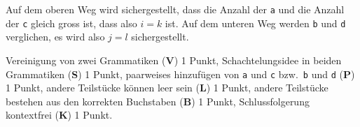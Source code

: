 \begin{loesung}
\begin{center}
\end{center}
Auf dem oberen Weg wird sichergestellt, dass die Anzahl der \texttt{a} und
die Anzahl der \texttt{c} gleich gross ist, dass also $i=k$ ist.
Auf dem unteren Weg werden \texttt{b} und \texttt{d} verglichen, es wird
also $j=l$ sichergestellt.
\end{loesung}

\begin{bewertung}
Vereinigung von zwei Grammatiken ({\bf V}) 1 Punkt,
Schachtelungsidee in beiden Grammatiken ({\bf S}) 1 Punkt,
paarweises hinzufügen von \texttt{a} und \texttt{c} bzw.~\texttt{b} und
\texttt{d} ({\bf P}) 1 Punkt,
andere Teilstücke können leer sein ({\bf L}) 1 Punkt,
andere Teilstücke bestehen aus den korrekten Buchstaben ({\bf B}) 1 Punkt,
Schlussfolgerung kontextfrei ({\bf K}) 1 Punkt.
\end{bewertung}

